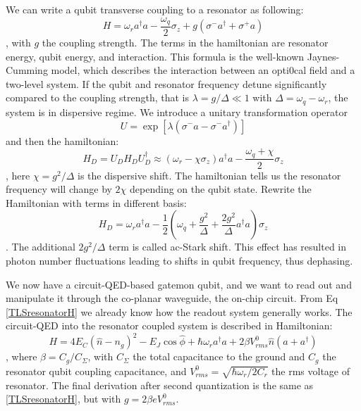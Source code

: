 We can write a qubit transverse coupling to a resonator as following\cite{RN8}:
\begin{equation}
    H = \omega_ra^\dagger a-\frac{\omega_q}{2}\sigma_z + g(\sigma^-a^\dagger+\sigma^+a)
\end{equation}
, with $g$ the coupling strength. The terms in the hamiltonian are resonator energy, qubit energy, and interaction. This formula is the well-known Jaynes-Cumming model, which describes the interaction between an opti0cal field and a two-level system. If the qubit and resonator frequency detune significantly compared to the coupling strength, that is $\lambda = g / \Delta \ll 1$ with $\Delta = \omega_q-\omega_r$, the system is in dispersive regime. We introduce a unitary transformation operator 
\begin{equation}
    U = \exp[{\lambda(\sigma^-a -\sigma^-a^\dagger)}]
\end{equation}
and then the hamiltonian:
\begin{equation}
    H_D = U_DH_DU_D^\dagger \approx (\omega_r-\chi\sigma_z)a^\dagger a-\frac{\omega_q+\chi}{2}\sigma_z
\end{equation}
, here $\chi = g^2 / \Delta$ is the dispersive shift. The hamiltonian tells us the resonator frequency will change by $2\chi$ depending on the qubit state. Rewrite the Hamiltonian with terms in different basis:
\begin{equation}\label{TLSresonatorH}
    H_D = \omega_r a^\dagger a - \frac{1}{2}(\omega_q + \frac{g^2}{\Delta} + \frac{2g^2}{\Delta}a^\dagger a)\sigma_z
\end{equation}
. The additional $2g^2/\Delta$ term is called ac-Stark shift. This effect has resulted in photon number fluctuations leading to shifts in qubit frequency, thus dephasing. 

We now have a circuit-QED-based gatemon qubit, and we want to read out and manipulate it through the co-planar waveguide, the on-chip circuit. From Eq \ref{TLSresonatorH} we already know how the readout system generally works. The circuit-QED into the resonator coupled system is described in Hamiltonian\cite{RN6}:
\begin{equation}
    H = 4E_C(\hat{n} - n_g)^2 - E_J\cos{\hat{\phi}} + \hbar\omega_r a^\dagger a + 2\beta V^0_{rms}\hat{n}(a + a^\dagger)
\end{equation}
, where $\beta = C_g/C_\Sigma$, with $C_\Sigma$ the total capacitance to the ground and $C_g$ the resonator qubit coupling capacitance, and $V^0_{rms} = \sqrt{\hbar\omega_r / 2C_r}$ the rms voltage of resonator. The final derivation after second quantization is the same as \ref{TLSresonatorH}, but with $g = 2\beta e V^0_{rms}$.

